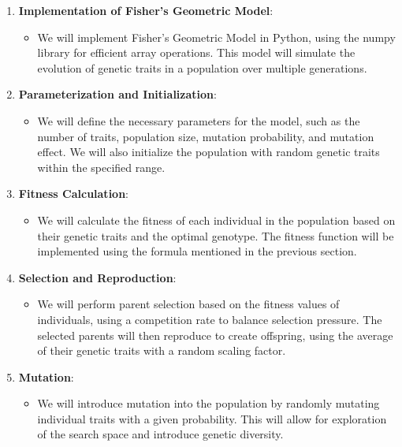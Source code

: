 \documentclass{article}
\begin{document}
\begin{enumerate}
    \item \textbf{Implementation of Fisher's Geometric Model}:
    \begin{itemize}
        \item We will implement Fisher's Geometric Model in Python, using the numpy library for efficient array operations. This model will simulate the evolution of genetic traits in a population over multiple generations.
    \end{itemize}
    
    \item \textbf{Parameterization and Initialization}:
    \begin{itemize}
        \item We will define the necessary parameters for the model, such as the number of traits, population size, mutation probability, and mutation effect. We will also initialize the population with random genetic traits within the specified range.
    \end{itemize}
    
    \item \textbf{Fitness Calculation}:
    \begin{itemize}
        \item We will calculate the fitness of each individual in the population based on their genetic traits and the optimal genotype. The fitness function will be implemented using the formula mentioned in the previous section.
    \end{itemize}
    
    \item \textbf{Selection and Reproduction}:
    \begin{itemize}
        \item We will perform parent selection based on the fitness values of individuals, using a competition rate to balance selection pressure. The selected parents will then reproduce to create offspring, using the average of their genetic traits with a random scaling factor.
    \end{itemize}
    
    \item \textbf{Mutation}:
    \begin{itemize}
        \item We will introduce mutation into the population by randomly mutating individual traits with a given probability. This will allow for exploration of the search space and introduce genetic diversity.
    \end{itemize}
    

\end{enumerate}
\end{document}

